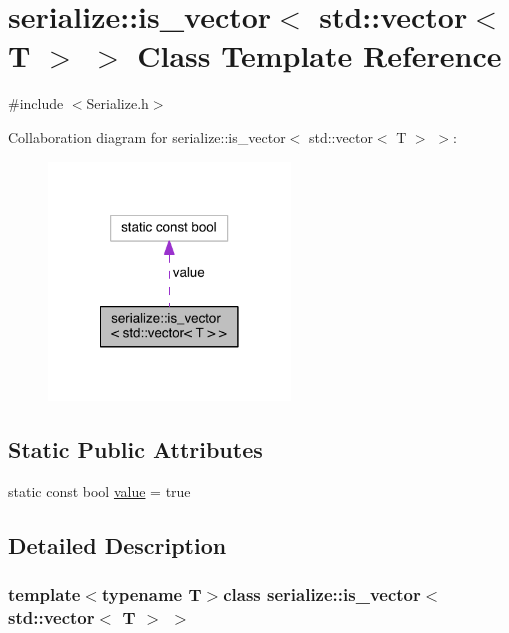 \hypertarget{classserialize_1_1is__vector_3_01std_1_1vector_3_01_t_01_4_01_4}{}\section{serialize\+:\+:is\+\_\+vector$<$ std\+:\+:vector$<$ T $>$ $>$ Class Template Reference}
\label{classserialize_1_1is__vector_3_01std_1_1vector_3_01_t_01_4_01_4}


{\ttfamily \#include $<$Serialize.\+h$>$}



Collaboration diagram for serialize\+:\+:is\+\_\+vector$<$ std\+:\+:vector$<$ T $>$ $>$\+:\nopagebreak
\begin{figure}[H]
\begin{center}
\leavevmode
\includegraphics[width=182pt]{classserialize_1_1is__vector_3_01std_1_1vector_3_01_t_01_4_01_4__coll__graph}
\end{center}
\end{figure}
\subsection*{Static Public Attributes}
\begin{DoxyCompactItemize}
\item 
static const bool \hyperlink{classserialize_1_1is__vector_3_01std_1_1vector_3_01_t_01_4_01_4_ab331b67d5bf759246c7998eb63d341ec}{value} = true
\end{DoxyCompactItemize}


\subsection{Detailed Description}
\subsubsection*{template$<$typename T$>$class serialize\+::is\+\_\+vector$<$ std\+::vector$<$ T $>$ $>$}



